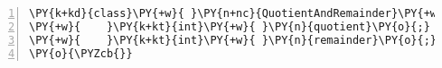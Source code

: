 \begin{Verbatim}[commandchars=\\\{\},numbers=left,firstnumber=1,stepnumber=1,frame=single,fontsize=\small]
\PY{k+kd}{class}\PY{+w}{ }\PY{n+nc}{QuotientAndRemainder}\PY{+w}{ }\PY{o}{\PYZob{}}
\PY{+w}{    }\PY{k+kt}{int}\PY{+w}{ }\PY{n}{quotient}\PY{o}{;}
\PY{+w}{    }\PY{k+kt}{int}\PY{+w}{ }\PY{n}{remainder}\PY{o}{;}
\PY{o}{\PYZcb{}}
\end{Verbatim}
